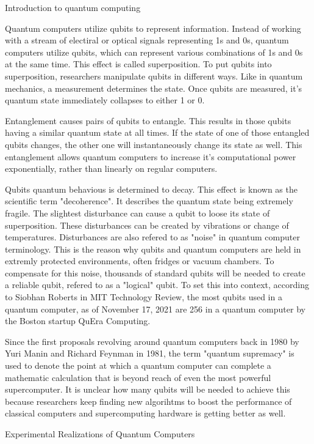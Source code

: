 \documentclass[aps,twocolumn,preprintnumbers]{revtex4}
\begin{document}
\begin{section}{Introduction to quantum computing}
    

Quantum computers utilize qubits to represent information. 
Instead of working with a stream of electiral or optical signals representing 1s and 0s, 
quantum computers utilize qubits, which can represent various combinations of 1s and 0s at the same time. 
This effect is called superposition. To put qubits into superposition, 
researchers manipulate qubits in different ways. Like in quantum mechanics, 
a measurement determines the state. Once qubits are measured, 
it's quantum state immediately collapses to either 1 or 0.

Entanglement causes pairs of qubits to entangle.
This results in those qubits having a similar quantum state at all times.
If the state of one of those entangled qubits changes,
the other one will instantaneously change its state as well.
This entanglement allows quantum computers to increase it's computational power exponentially,
rather than linearly on regular computers.

Qubits quantum behavious is determined to decay.
This effect is known as the scientific term "decoherence".
It describes the quantum state being extremely fragile.
The slightest disturbance can cause a qubit to loose its state of superposition.
These disturbances can be created by vibrations or change of temperatures.
Disturbances are also refered to as "noise" in quantum computer terminology.
This is the reason why qubits and quantum computers are held in extremly protected environments, 
often fridges or vacuum chambers.
To compensate for this noise, 
thousands of standard qubits will be needed to create a reliable qubit, 
refered to as a "logical" qubit. 
To set this into context, 
according to Siobhan Roberts in MIT Technology Review, 
the most qubits used in a quantum computer, 
as of November 17, 2021 are 256 in a quantum computer by the Boston startup QuEra Computing. 

Since the first proposals revolving around quantum computers back in 1980 by Yuri Manin and Richard Feynman in 1981,
the term "quantum supremacy" is used to denote the point at which a quantum computer can complete a mathematic calculation that is beyond reach of even the most powerful supercomputer.
It is unclear how many qubits will be needed to achieve this because researchers keep finding new algorihtms to boost the performance of classical computers and supercomputing hardware is getting better as well.

\end{section}

\begin{section}{Experimental Realizations of Quantum Computers}

\end{section}
\end{document}

